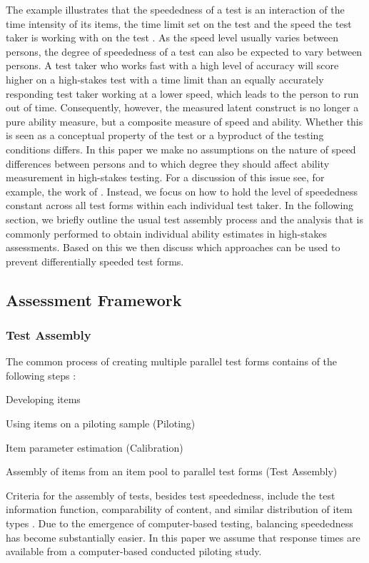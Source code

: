 \documentclass[a4paper,man,apacite,donotrepeattitle]{apa6}
\begin{document}
The example illustrates that the speededness of a test is an interaction of the time intensity of its items, the time limit set on the test and the speed the test taker is working with on the test \cite{vanderLinden.2011ATA}. As the speed level usually varies between persons, the degree of speededness of a test can also be expected to vary between persons. A test taker who works fast with a high level of accuracy will score higher on a high-stakes test with a time limit than an equally accurately responding test taker working at a lower speed, which leads to the person to run out of time. Consequently, however, the measured latent construct is no longer a pure ability measure, but a composite measure of speed and ability. Whether this is seen as a conceptual property of the test or a byproduct of the testing conditions differs. In this paper we make no assumptions on the nature of speed differences between persons and to which degree they should affect ability measurement in high-stakes testing. For a discussion of this issue see, for example, the work of . Instead, we focus on how to hold the level of speededness constant across all test forms within each individual test taker. In the following section, we briefly outline the usual test assembly process and the analysis that is commonly performed to obtain individual ability estimates in high-stakes assessments. Based on this we then discuss which approaches can be used to prevent differentially speeded test forms.

\subsection{Assessment Framework}
\subsubsection{Test Assembly}
The common process of creating multiple parallel test forms contains of the following steps \cite{SAT.2016, vanderLinden.2005}: 
\begin{APAenumerate}
\item Developing items 
\item Using items on a piloting sample (Piloting)
\item Item parameter estimation (Calibration)
\item Assembly of items from an item pool to parallel test forms (Test Assembly)
\end{APAenumerate}
Criteria for the assembly of tests, besides test speededness, include the test information function, comparability of content, and similar distribution of item types \cite{vanderLinden.2005}. Due to the emergence of computer-based testing, balancing speededness has become substantially easier. In this paper we assume that response times are available from a computer-based conducted piloting study. 
\end{document}
